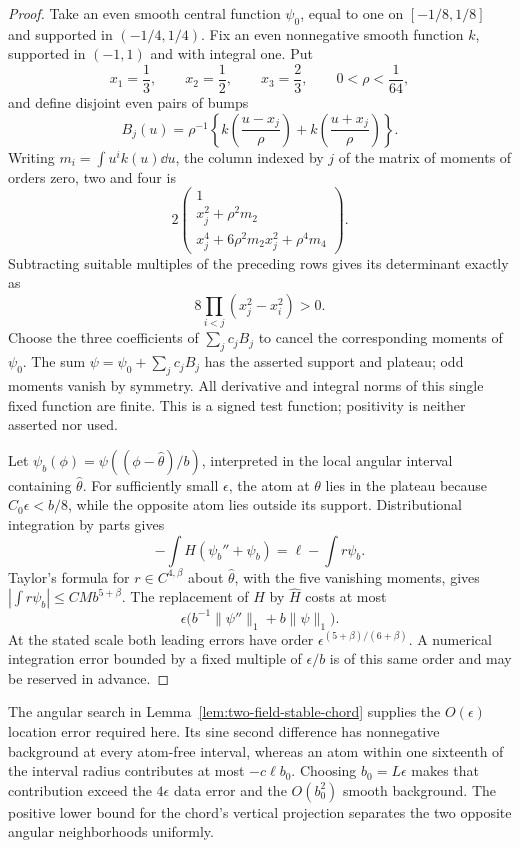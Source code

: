 \begin{proof}
Take an even smooth central function $\psi_0$, equal to one on
$[-1/8,1/8]$ and supported in $(-1/4,1/4)$.  Fix an even
nonnegative smooth function $k$, supported in $(-1,1)$ and with
integral one.  Put
\[
 x_1=\frac13,\qquad x_2=\frac12,\qquad x_3=\frac23,
            \qquad 0<\rho<\frac1{64},
\]
and define disjoint even pairs of bumps
\[
 B_j(u)=\rho^{-1}\left\{
       k\left(\frac{u-x_j}{\rho}\right)
          +k\left(\frac{u+x_j}{\rho}\right)\right\}.
\]
Writing $m_i=\int u^i k(u)\dd u$, the column indexed by $j$
of the matrix of moments of orders zero, two and four is
\[
 2\begin{pmatrix}
 1\\ x_j^2+\rho^2m_2\\
 x_j^4+6\rho^2m_2x_j^2+\rho^4m_4
 \end{pmatrix}.
\]
Subtracting suitable multiples of the preceding rows gives its
determinant exactly as
\[
                 8\prod_{i<j}(x_j^2-x_i^2)>0.
\]
Choose the three coefficients of $\sum_j c_jB_j$ to cancel
the corresponding moments of $\psi_0$.  The sum
$\psi=\psi_0+\sum_jc_jB_j$ has the asserted support and plateau;
odd moments vanish by symmetry.  All derivative and integral norms
of this single fixed function are finite.  This is a signed test
function; positivity is neither asserted nor used.

Let $\psi_b(\phi)=\psi((\phi-\widehat\theta)/b)$, interpreted
in the local angular interval containing $\widehat\theta$.
For sufficiently small $\epsilon$, the atom at $\theta$ lies
in the plateau because $C_0\epsilon<b/8$, while the opposite
atom lies outside its support.  Distributional integration by
parts gives
\[
       -\int H(\psi_b''+\psi_b)
             =\ell-\int r\psi_b.
\]
Taylor's formula for $r\in C^{4,\beta}$ about
$\widehat\theta$, with the five vanishing moments, gives
$|\int r\psi_b|\le C M b^{5+\beta}$.
The replacement of $H$ by $\widehat H$ costs at most
\[
 \epsilon\bigl(b^{-1}\|\psi''\|_1+b\|\psi\|_1\bigr).
\]
At the stated scale both leading errors have order
$\epsilon^{(5+\beta)/(6+\beta)}$.  A numerical integration
error bounded by a fixed multiple of $\epsilon/b$ is of this
same order and may be reserved in advance.
\end{proof}

The angular search in Lemma~\ref{lem:two-field-stable-chord}
supplies the $O(\epsilon)$ location error required here.  Its sine
second difference has nonnegative background at every atom-free
interval, whereas an atom within one sixteenth of the interval
radius contributes at most $-c\ell b_0$.  Choosing
$b_0=L\epsilon$ makes that contribution exceed the
$4\epsilon$ data error and the $O(b_0^2)$ smooth background.
The positive lower bound for the chord's vertical projection
separates the two opposite angular neighborhoods uniformly.

